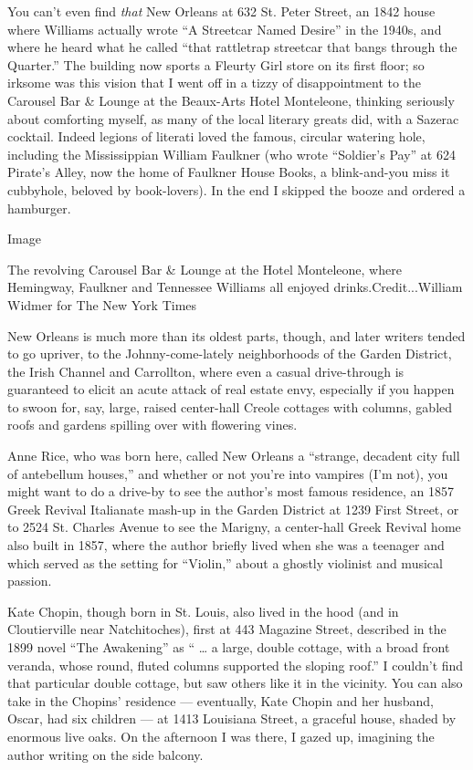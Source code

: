 You can't even find \emph{that} New Orleans at 632 St. Peter Street, an
1842 house where Williams actually wrote ``A Streetcar Named Desire'' in
the 1940s, and where he heard what he called ``that rattletrap streetcar
that bangs through the Quarter.'' The building now sports a Fleurty Girl
store on its first floor; so irksome was this vision that I went off in
a tizzy of disappointment to the Carousel Bar \& Lounge at the
Beaux-Arts Hotel Monteleone, thinking seriously about comforting myself,
as many of the local literary greats did, with a Sazerac cocktail.
Indeed legions of literati loved the famous, circular watering hole,
including the Mississippian William Faulkner (who wrote ``Soldier's
Pay'' at 624 Pirate's Alley, now the home of Faulkner House Books, a
blink-and-you miss it cubbyhole, beloved by book-lovers). In the end I
skipped the booze and ordered a hamburger.

Image

The revolving Carousel Bar \& Lounge at the Hotel Monteleone, where
Hemingway, Faulkner and Tennessee Williams all enjoyed
drinks.Credit...William Widmer for The New York Times

New Orleans is much more than its oldest parts, though, and later
writers tended to go upriver, to the Johnny-come-lately neighborhoods of
the Garden District, the Irish Channel and Carrollton, where even a
casual drive-through is guaranteed to elicit an acute attack of real
estate envy, especially if you happen to swoon for, say, large, raised
center-hall Creole cottages with columns, gabled roofs and gardens
spilling over with flowering vines.

Anne Rice, who was born here, called New Orleans a ``strange, decadent
city full of antebellum houses,'' and whether or not you're into
vampires (I'm not), you might want to do a drive-by to see the author's
most famous residence, an 1857 Greek Revival Italianate mash-up in the
Garden District at 1239 First Street, or to 2524 St. Charles Avenue to
see the Marigny, a center-hall Greek Revival home also built in 1857,
where the author briefly lived when she was a teenager and which served
as the setting for ``Violin,'' about a ghostly violinist and musical
passion.

Kate Chopin, though born in St. Louis, also lived in the hood (and in
Cloutierville near Natchitoches), first at 443 Magazine Street,
described in the 1899 novel ``The Awakening'' as `` \ldots{} a large,
double cottage, with a broad front veranda, whose round, fluted columns
supported the sloping roof.'' I couldn't find that particular double
cottage, but saw others like it in the vicinity. You can also take in
the Chopins' residence --- eventually, Kate Chopin and her husband,
Oscar, had six children --- at 1413 Louisiana Street, a graceful house,
shaded by enormous live oaks. On the afternoon I was there, I gazed up,
imagining the author writing on the side balcony.


